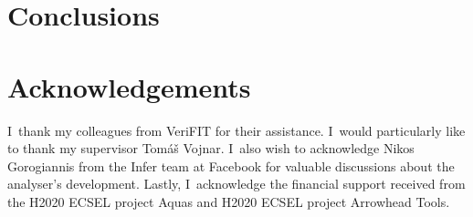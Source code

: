 \documentclass{ExcelAtFIT}
\theoremstyle{definition}
\begin{document}


\section{Conclusions}
\label{sec:conc}



\section*{Acknowledgements}
I~thank my colleagues from VeriFIT for their assistance. I~would particularly like to thank my supervisor Tomáš Vojnar. I~also wish to acknowledge Nikos Gorogiannis from the Infer team at Facebook for valuable discussions about the analyser’s development. Lastly, I~acknowledge the financial support received from the H2020 ECSEL project Aquas and H2020 ECSEL project Arrowhead Tools.






\end{document}
